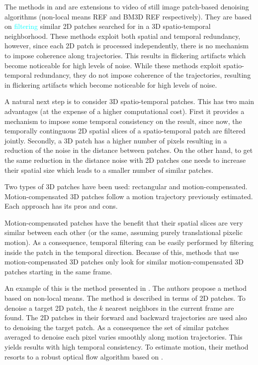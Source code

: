 \documentclass[10pt, journal, twocolumn, final, a4paper]{IEEEtran}
\newcommand{\suggest}[1]{\textcolor{cyan}{#1}}
\begin{document}
The methods in \cite{Buades2005v} and \cite{Dabov2007v} are extensions to video
of still image patch-based denoising algorithms (non-local means REF and BM3D
REF respectively). They are based on \suggest{filtering} similar 2D patches
searched for in a 3D spatio-temporal neighborhood.  These methods exploit both
spatial and temporal redundancy, however, since each 2D patch is processed
independently, there is no mechanism to impose coherence along trajectories.
This results in flickering artifacts which become noticeable for high levels of
noise. 
%
While these methods exploit spatio-temporal redundancy, they do not impose
coherence of the trajectories, resulting in flickering
artifacts which become noticeable for high levels of noise. 

A natural next step is to consider 3D spatio-temporal patches. This has two
main advantages (at the expense of a higher computational cost). First it
provides a mechanism to impose some temporal consistency on the result, since
now, the temporally continguous 2D spatial slices of a spatio-temporal patch
are filtered jointly. Secondly, a 3D patch has a higher number of pixels
resulting in a reduction of the noise in the distance between patches. On the
other hand, to get the same reduction in the distance noise with 2D patches one
needs to increase their spatial size which leads to a smaller number of similar
patches.

Two types of 3D patches have been used: rectangular and motion-compensated.
Motion-compensated 3D patches follow a motion trajectory previously estimated.
Each approach has its pros and cons.

Motion-compensated patches have the benefit that their spatial slices are very
similar between each other (or the same, assuming purely translational pixelic
motion). As a consequence, temporal filtering can be easily performed by
filtering inside the patch in the temporal direction. 
Because of this, methods that use motion-compensated 3D patches only look for
similar motion-compensated 3D patches starting in the same frame.


%
An example of this is the method presented in \cite{Liu2010}. The authors
propose a method based on non-local means. The method is described in terms of
2D patches. To denoise a target 2D patch, the $k$ nearest neighbors in the current
frame are found. The 2D patches in their forward and backward trajectories are
used also to denoising the target patch. As a consequence the set of similar
patches averaged to denoise each pixel varies smoothly along motion
trajectories. This yields results with high temporal consistency. 
To estimate motion, their method resorts to a robust optical flow algorithm
based on \cite{Bruhn2005}.
\end{document}
